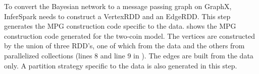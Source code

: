 
To convert the Bayesian network to a message passing graph on GraphX,
InferSpark needs to construct a VertexRDD and an EdgeRDD. This step generates
the MPG construction code specific to the data.
 shows the MPG construction code
generated for the two-coin model. 
The vertices are constructed by the union
of three RDD's, one of which from the data and the others from 
parallelized collections (lines 8 and line 9 in ).
The edges are built from the data only. 
A partition strategy specific to the
data is also generated in this step.




